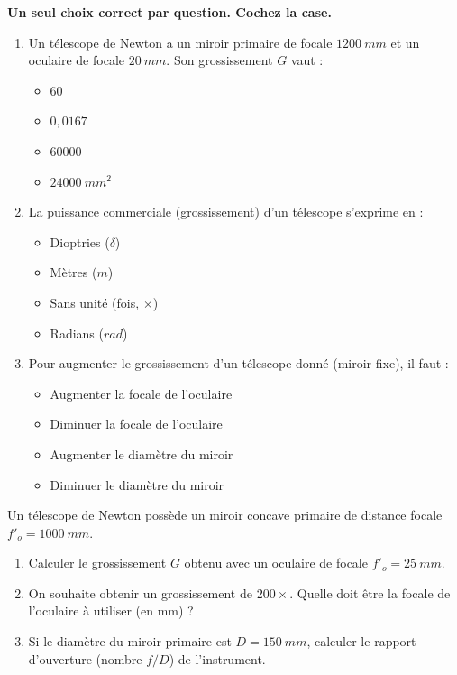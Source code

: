 \documentclass[11pt]{article}
\begin{document}
\begin{exercice}
\label{exo:qcm}
\textbf{Un seul choix correct par question. Cochez la case.}
\begin{enumerate}
    \item Un télescope de Newton a un miroir primaire de focale $\SI{1200}{mm}$ et un oculaire de focale $\SI{20}{mm}$. Son grossissement $G$ vaut :
\begin{itemize}
        \item[$\square$] $60$
        \item[$\square$] $0,0167$
        \item[$\square$] $\num{60000}$
        \item[$\square$] $\SI{24000}{mm^2}$
    \end{itemize}
    \item La puissance commerciale (grossissement) d'un télescope s'exprime en :
\begin{itemize}
        \item[$\square$] Dioptries ($\delta$)
        \item[$\square$] Mètres ($m$)
        \item[$\square$] Sans unité (fois, $\times$)
        \item[$\square$] Radians ($rad$)
    \end{itemize}
    \item Pour augmenter le grossissement d'un télescope donné (miroir fixe), il faut :
\begin{itemize}
        \item[$\square$] Augmenter la focale de l'oculaire
        \item[$\square$] Diminuer la focale de l'oculaire
        \item[$\square$] Augmenter le diamètre du miroir
        \item[$\square$] Diminuer le diamètre du miroir
    \end{itemize}
\end{enumerate}
\end{exercice}

\begin{exercice}
\label{exo:calc}
Un télescope de Newton possède un miroir concave primaire de distance focale $f'_o = \SI{1000}{mm}$.
\begin{enumerate}
    \item Calculer le grossissement $G$ obtenu avec un oculaire de focale $f'_o = \SI{25}{mm}$.
    \item On souhaite obtenir un grossissement de $200\times$. Quelle doit être la focale de l'oculaire à utiliser (en mm) ?
    \item Si le diamètre du miroir primaire est $D = \SI{150}{mm}$, calculer le rapport d'ouverture (nombre $f/D$) de l'instrument.
\end{enumerate}
\end{exercice}
\end{document}
